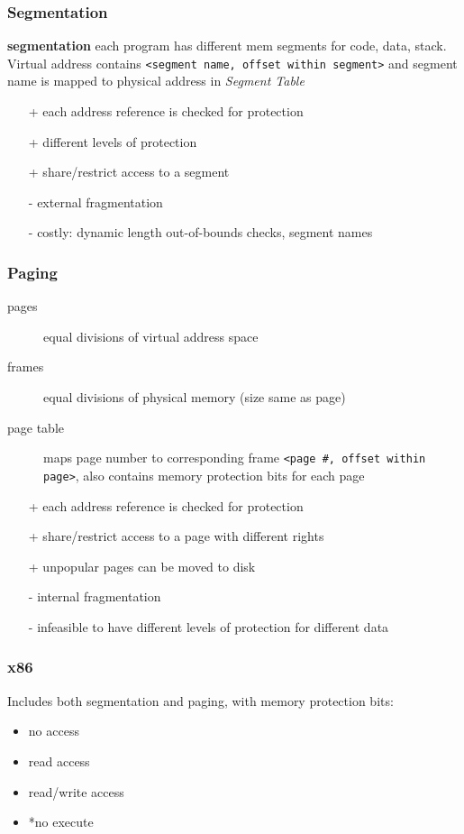 \documentclass[]{article}
\theoremstyle{definition}
\begin{document}
	\subsubsection{Segmentation}
	\textbf{segmentation} each program has different mem segments for code, data, stack.
	 Virtual address contains \lstinline|<segment name, offset within segment>| and segment name is mapped to physical address in \textit{Segment Table}
	\begin{itemize}
		\item[+] each address reference is checked for protection
		\item[+] different levels of protection
		\item[+] share/restrict access to a segment
		\item[-] external fragmentation
		\item[-] costly: dynamic length out-of-bounds checks, segment names
	\end{itemize}

	\subsubsection{Paging}
	\begin{description}
		\item[pages] equal divisions of virtual address space
		\item[frames] equal divisions of physical memory (size same as page)
		\item[page table] maps page number to corresponding frame \lstinline|<page #, offset within page>|, also contains memory protection bits for each page
	\end{description}
	\begin{itemize}
		\item[+] each address reference is checked for protection
		\item[+] share/restrict access to a page with different rights
		\item[+] unpopular pages can be moved to disk
		\item[-] internal fragmentation
		\item[-] infeasible to have different levels of protection for different data
	\end{itemize}

	\subsubsection{x86}
	Includes both segmentation and paging, with memory protection bits:
	\begin{itemize}
		\item no access
		\item read access
		\item read/write access
		\item *no execute
	\end{itemize}
\end{document}
